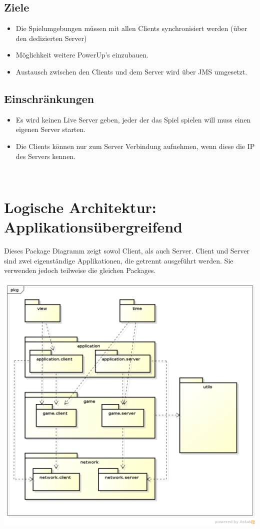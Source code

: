 \documentclass[11pt]{scrartcl}
\begin{document}
\subsection{Ziele}
\begin{itemize}
    \item Die Spielumgebungen müssen mit allen Clients synchronisiert werden (über den dedizierten Server)
    \item Möglichkeit weitere PowerUp's einzubauen.
    \item Austausch zwischen den Clients und dem Server wird über JMS umgesetzt.
\end{itemize}


\subsection{Einschränkungen}
\begin{itemize}
    \item Es wird keinen Live Server geben, jeder der das Spiel spielen will muss einen eigenen Server starten.
    \item Die Clients können nur zum Server Verbindung aufnehmen, wenn diese die IP des Servers kennen.
\end{itemize}


\newpage
 
\section{Logische Architektur: Applikationsübergreifend}
Dieses Package Diagramm zeigt sowol Client, als auch Server. Client und Server sind zwei eigenständige Applikationen, die getrennt ausgeführt werden. Sie verwenden jedoch teilweise die gleichen Packages.

\includegraphics[scale=0.5]{LogischeSicht}
\end{document}
